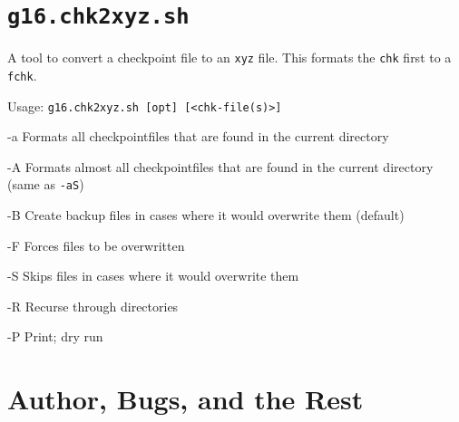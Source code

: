 \documentclass[final, a4paper, columns=3, margin=1.0cm, 10pt]{refcard}
\begin{document}
\section{\texttt{g16.chk2xyz.sh}}

A tool to convert a checkpoint file to an \texttt{xyz} file. 
This formats the \texttt{chk} first to a \texttt{fchk}.

Usage: \texttt{g16.chk2xyz.sh [opt] [<chk-file(s)>]}

\begin{refcardlist}[labelfont=\ttfamily]
  \item[-a      ] Formats all checkpointfiles that are found in the current directory
  \item[-A      ] Formats almost all checkpointfiles that are found in the current directory (same as \texttt{-aS})
  \item[-B      ] Create backup files in cases where it would overwrite them (default)
  \item[-F      ] Forces files to be overwritten
  \item[-S      ] Skips files in cases where it would overwrite them
  \item[-R      ] Recurse through directories
  \item[-P      ] Print; dry run
\end{refcardlist}

\vfill
\section{Author, Bugs, and the Rest}

\end{document}
